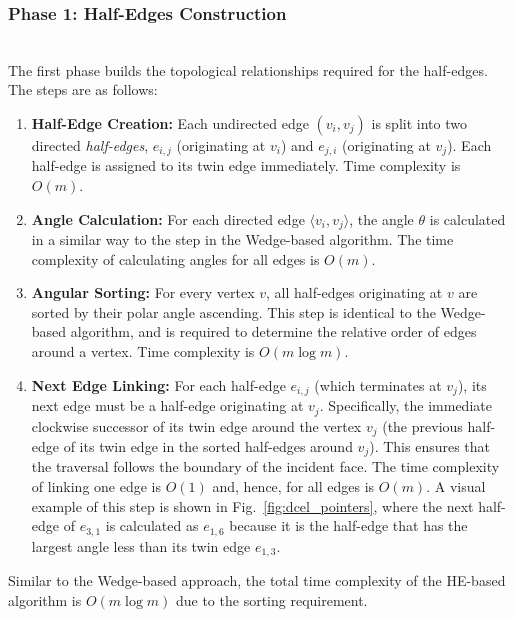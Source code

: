 \documentclass[conference]{IEEEtran}
\begin{document}
\subsubsection{Phase 1: Half-Edges Construction}\hfill\\
The first phase builds the topological relationships required for the half-edges. The steps are as follows:

\begin{enumerate}
    \item \textbf{Half-Edge Creation:} Each undirected edge $(v_i, v_j)$ is split into two directed \textit{half-edges}, $e_{i,j}$ (originating at $v_i$) and $e_{j,i}$ (originating at $v_j$). Each half-edge is assigned to its twin edge immediately. Time complexity is $O(m)$.
    \item \textbf{Angle Calculation:} For each directed edge \( \langle v_i, v_j\rangle \), the angle \( \theta\) is calculated in a similar way to the step in the Wedge-based algorithm. The time complexity of calculating angles for all edges is \( O(m) \).
    \item \textbf{Angular Sorting:} For every vertex $v$, all half-edges originating at $v$ are sorted by their polar angle ascending. This step is identical to the Wedge-based algorithm, and is required to determine the relative order of edges around a vertex. Time complexity is $O(m \log m)$.
    \item \textbf{Next Edge Linking:} For each half-edge $e_{i,j}$ (which terminates at $v_j$), its next edge must be a half-edge originating at $v_j$. Specifically, the immediate clockwise successor of its twin edge around the vertex $v_j$ (the previous half-edge of its twin edge in the sorted half-edges around $v_j$). This ensures that the traversal follows the boundary of the incident face. The time complexity of linking one edge is $O(1)$ and, hence, for all edges is $O(m)$. A visual example of this step is shown in Fig.~\ref{fig:dcel_pointers}, where the next half-edge of $e_{3,1}$ is calculated as $e_{1,6}$ because it is the half-edge that has the largest angle less than its twin edge $e_{1,3}$.
\end{enumerate}

Similar to the Wedge-based approach, the total time complexity of the HE-based algorithm is $O(m \log m)$ due to the sorting requirement.
\end{document}
